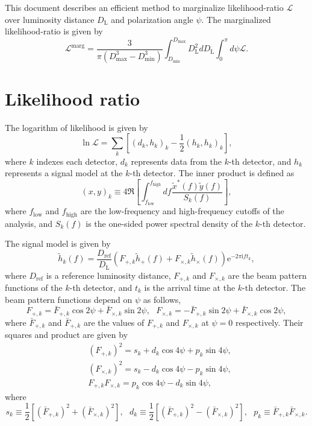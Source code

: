 \documentclass[12pt]{article}
\renewcommand{\L}{\mathcal{L}}
\newcommand{\Lmarg}{\mathcal{L}^{\mathrm{marg}}}
\newcommand{\flow}{f_{\mathrm{low}}}
\newcommand{\fhigh}{f_{\mathrm{high}}}
\newcommand{\Dref}{D_{\mathrm{ref}}}
\newcommand{\DL}{D_{\mathrm{L}}}
\newcommand{\thk}{\tilde{h}_k}
\newcommand{\thp}{\tilde{h}_+}
\newcommand{\thc}{\tilde{h}_{\times}}
\newcommand{\Fpk}{F_{+, k}}
\newcommand{\Fck}{F_{\times, k}}
\newcommand{\bFpk}{\bar{F}_{+, k}}
\newcommand{\bFck}{\bar{F}_{\times, k}}
\newcommand{\Dmin}{D_{\mathrm{min}}}
\newcommand{\Dmax}{D_{\mathrm{max}}}
\newcommand{\e}{\mathrm{e}}
\newcommand{\iu}{\mathrm{i}}
\begin{document}
This document describes an efficient method to marginalize likelihood-ratio $\L$ over luminosity distance $\DL$ and polarization angle $\psi$.
The marginalized likelihood-ratio is given by
\begin{equation}
\Lmarg = \frac{3}{\pi (\Dmax^3 - \Dmin^3)} \int^{\Dmax}_{\Dmin} \DL^2 d \DL \int^{\pi}_0 d \psi \L. \label{eq:Lmarg}
\end{equation}


\section{Likelihood ratio}

The logarithm of likelihood is given by
\begin{equation}
\ln \L = \sum_k \left[ (d_k, h_k)_k - \frac{1}{2} (h_k, h_k)_k \right],
\end{equation}
where $k$ indexes each detector, $d_k$ represents data from the $k$-th detector, and $h_k$ represents a signal model at the $k$-th detector.
The inner product is defined as
\begin{equation}
(x, y)_k \equiv 4 \Re \left[ \int^{\fhigh}_{\flow} df \frac{\tilde{x}^\ast (f) \tilde{y}(f)}{S_k(f)} \right],
\end{equation}
where $\flow$ and $\fhigh$ are the low-frequency and high-frequency cutoffs of the analysis, and $S_k(f)$ is the one-sided power spectral density of the $k$-th detector.

The signal model is given by
\begin{equation}
\thk(f) = \frac{\Dref}{\DL} \left( \Fpk \thp(f) + \Fck \thc(f) \right) \e^{-2 \pi \iu f t_k},
\end{equation}
where $\Dref$ is a reference luminosity distance, $\Fpk$ and $\Fck$ are the beam pattern functions of the $k$-th detector, and $t_k$ is the arrival time at the $k$-th detector.
The beam pattern functions depend on $\psi$ as follows,
\begin{equation}
\Fpk = \bFpk \cos 2 \psi + \bFck \sin 2 \psi,~~~\Fck = - \bFpk \sin 2 \psi + \bFck \cos 2 \psi, \label{eq:beampatterns}
\end{equation}
where $\bFpk$ and $\bFpk$ are the values of $\Fpk$ and $\Fck$ at $\psi=0$ respectively.
Their squares and product are given by
\begin{equation}
\begin{aligned}
&(\Fpk)^2 = s_k + d_k \cos 4 \psi + p_k  \sin 4 \psi, \\
&(\Fck)^2 = s_k - d_k \cos 4 \psi - p_k  \sin 4 \psi, \\
&\Fpk \Fck = p_k \cos 4 \psi - d_k \sin 4 \psi,
\end{aligned} \label{eq:beampatternsquares}
\end{equation}
where
\begin{equation}
s_k \equiv \frac{1}{2} \left[ (\bFpk)^2 + (\bFck)^2 \right],~~~d_k \equiv \frac{1}{2} \left[ (\bFpk)^2 - (\bFck)^2 \right],~~~p_k \equiv \bFpk  \bFck.
\end{equation}
\end{document}
